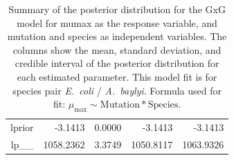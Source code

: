\begin{table}[ht]
\begin{tabular}{rrrrr}
  lprior & -3.1413 & 0.0000 & -3.1413 & -3.1413 \\ 
  lp\_\_ & 1058.2362 & 3.3749 & 1050.8117 & 1063.9326 \\ 
   \hline
\end{tabular}
\caption{Summary of the posterior distribution for the GxG model for mumax as the response variable, and mutation and species as independent variables. The columns show the mean, standard deviation, and credible interval of the posterior distribution for each estimated parameter. This model fit is for species pair \textit{E.~coli} / \textit{A.~baylyi}.  Formula used for fit: $\mu_{\text{max}} \sim \text{Mutation} * \text{Species}$.} 
\label{supptab:GxG_mumax_EC_AB}
\end{table}



